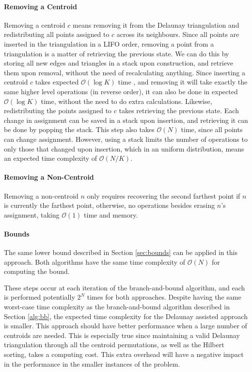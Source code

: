 \paragraph{Removing a Centroid}
Removing a centroid $c$ means removing it from the Delaunay triangulation and redistributing all points assigned to $c$ across its neighbours.
Since all points are inserted in the triangulation in a LIFO order, removing a point from a triangulation is a matter of retrieving the previous state. We can do this by storing all new edges and triangles in a stack upon construction, and retrieve them upon removal, without the need of recalculating anything. Since inserting a centroid $c$ takes expected $\mathcal{O}(\log{K})$ time \cite{tricomplex}, and removing it will take exactly the same higher level operations (in reverse order), it can also be done in expected $\mathcal{O}(\log{K})$ time, without the need to do extra calculations.
Likewise, redistributing the points assigned to $c$ takes retrieving the previous state. Each change in assignment can be saved in a stack upon insertion, and retrieving it can be done by popping the stack.
This step also takes $\mathcal{O}(N)$ time, since all points can change assignment. However, using a stack limits the number of operations to only those that changed upon insertion, which in an uniform distribution, means an expected time complexity of $\mathcal{O}(N/K)$.

\paragraph{Removing a Non-Centroid}
Removing a non-centroid $n$ only requires recovering the second farthest point if $n$ is currently the farthest point, otherwise, no operations besides erasing $n$'s assignment, taking $\mathcal{O}(1)$ time and memory.
\paragraph{Bounds}
The same lower bound described in Section \ref{sec:bounds} can be applied in this approach. Both algorithms have the same time complexity of $\mathcal{O}(N)$ for computing the bound.

These steps occur at each iteration of the branch-and-bound algorithm, and each is performed potentially $2^N$ times for both approaches.
Despite having the same worst-case time complexity as the branch-and-bound algorithm described in Section \ref{alg:bb}, the expected time complexity for the Delaunay assisted approach is smaller. This approach should have better performance when a large number of centroids are needed.
This is especially true since maintaining a valid Delaunay triangulation through all the centroid permutations, as well as the Hilbert sorting, takes a computing cost. This extra overhead will have a negative impact in the performance in the smaller instances of the problem.
